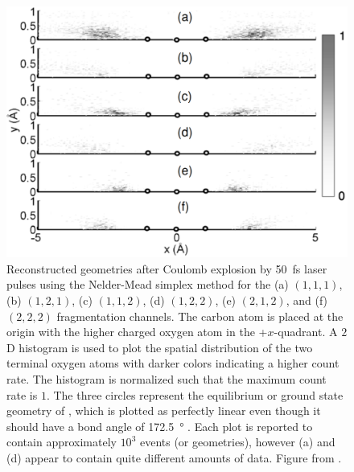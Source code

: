 \begin{figure}
  \centering
  \includegraphics[width=\textwidth]{gfx/SimplexJPhysB}
  \caption[Reconstructed  geometries using the Nelder-Mead simplex method.]
  {Reconstructed  geometries after Coulomb explosion by \SI{50}{\fs} laser pulses using the Nelder-Mead simplex method for the (a) $(1,1,1)$, (b) $(1,2,1)$, (c) $(1,1,2)$, (d) $(1,2,2)$, (e) $(2,1,2)$, and (f) $(2,2,2)$ fragmentation channels. The carbon atom is placed at the origin with the higher charged oxygen atom in the +$x$-quadrant. A $2$D histogram is used to plot the spatial distribution of the two terminal oxygen atoms with darker colors indicating a higher count rate. The histogram is normalized such that the maximum count rate is $1$. The three circles represent the equilibrium or ground state geometry of , which is plotted as perfectly linear even though it should have a bond angle of \SI{172.5}{\degree} \citep{Siegmann02, Mathur92}. Each plot is reported to contain approximately $10^3$ events (or geometries), however (a) and (d) appear to contain quite different amounts of data. Figure from \citet{Brichta07}.}
  \label{fig:simplexJPhysB}
\end{figure}

